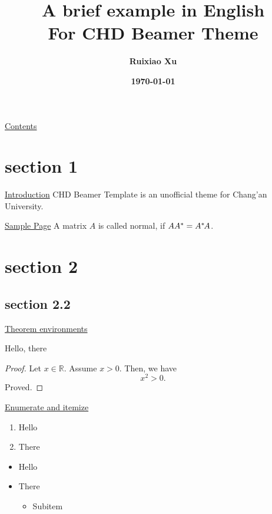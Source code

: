 \documentclass[11pt,aspectratio=43,xcolor={dvipsnames},hyperref={pdftex,pdfpagemode=UseNone,hidelinks,pdfdisplaydoctitle=true},usepdftitle=false]{ctexbeamer}
\title[CHD Beamer Template]{A brief example in English \\ \normalsize{For CHD Beamer Theme}}
\author{\textbf{Ruixiao Xu}}
\institute{School of Information Engineering\\Chang'an University}
\date{\textbf{\today}}
\begin{document}
\begin{frame}
  \maketitle
\end{frame}

\begin{frame}{\underline{Contents}}
  \tableofcontents
\end{frame}

\section{section 1}
\begin{frame}{\underline{Introduction}}
  \alert{CHD Beamer Template} is an unofficial theme for Chang'an University.
\end{frame}

\begin{frame}{\underline{Sample Page}}
  A matrix $A$ is called normal, if $AA^*=A^*\mskip-2muA$.
\end{frame}

\section{section 2}
\subsection{section 2.2}
\begin{frame}{\underline{Theorem environments}}

  \begin{theorem}
    Hello, there
  \end{theorem}

  \begin{proof}
    Let $x \in \mathbb{R}$. Assume $x > 0$. Then, we have
    \begin{equation}
      x^2 > 0.
    \end{equation}
    Proved.
  \end{proof}
\end{frame}

\begin{frame}{\underline{Enumerate and itemize}}
  \begin{enumerate}
    \item Hello
    \item There
  \end{enumerate}
  \begin{itemize}
    \item Hello
    \item There
          \begin{itemize}
            \item Subitem
          \end{itemize}
  \end{itemize}
\end{frame}
\end{document}
